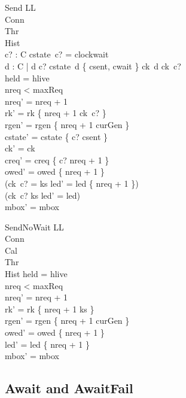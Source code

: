 \documentclass[a4paper,10pt,fleqn]{article}
\begin{document}
\begin{schema}{Send}
  \Delta LL \\
  \Xi Conn \\
  \Xi Thr \\
  \Xi Hist \\
  c? : C
\where
  cstate~c? = clockwait \\
  \forall d : C | d \neq c? \spot
    cstate~d \in \{ csent, cwait \} \implies ck~d \neq ck~c? \\
  held = hlive \\
  nreq < maxReq \\
  nreq' = nreq + 1 \\
  rk' = rk \oplus \{ nreq + 1 \mapsto ck~c? \} \\
  rgen' = rgen \oplus \{ nreq + 1 \mapsto curGen \} \\
  cstate' = cstate \oplus \{ c? \mapsto csent \} \\
  ck' = ck \\
  creq' = creq \oplus \{ c? \mapsto nreq + 1 \} \\
  owed' = owed \cup \{ nreq + 1 \} \\
  (ck~c? = ks \implies led' = led \cup \{ nreq + 1 \}) \\
  (ck~c? \neq ks \implies led' = led) \\
  mbox' = mbox
\end{schema}

\begin{schema}{SendNoWait}
  \Delta LL \\
  \Xi Conn \\
  \Xi Cal \\
  \Xi Thr \\
  \Xi Hist
\where
  held = hlive \\
  nreq < maxReq \\
  nreq' = nreq + 1 \\
  rk' = rk \oplus \{ nreq + 1 \mapsto ks \} \\
  rgen' = rgen \oplus \{ nreq + 1 \mapsto curGen \} \\
  owed' = owed \cup \{ nreq + 1 \} \\
  led' = led \cup \{ nreq + 1 \} \\
  mbox' = mbox
\end{schema}

\subsection{Await and AwaitFail}
\end{document}

